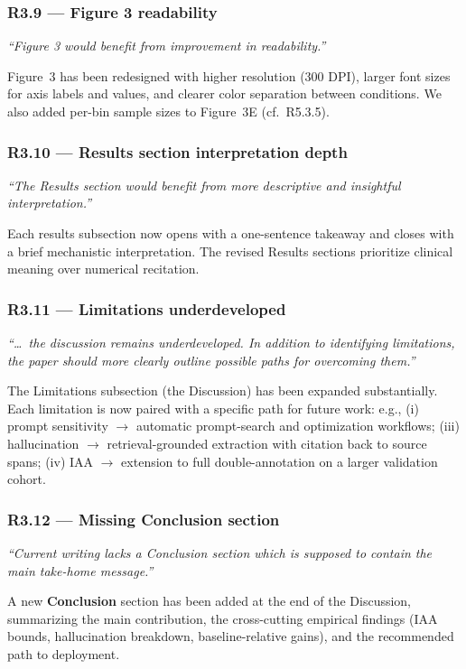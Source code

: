 \documentclass[11pt,letterpaper]{article}
\newcommand{\reviewer}[1]{\par\medskip\textcolor{blue!75!black}{\textit{#1}}\par\medskip}
\newcommand{\response}[1]{\par#1\par\medskip}
\begin{document}
\subsubsection*{R3.9 --- Figure 3 readability}
\reviewer{``Figure 3 would benefit from improvement in readability.''}
\response{Figure~3 has been redesigned with higher resolution (300 DPI), larger font sizes for axis labels and values, and clearer color separation between conditions. We also added per-bin sample sizes to Figure~3E (cf.\ R5.3.5).}

\subsubsection*{R3.10 --- Results section interpretation depth}
\reviewer{``The Results section would benefit from more descriptive and insightful interpretation.''}
\response{Each results subsection now opens with a one-sentence takeaway and closes with a brief mechanistic interpretation. The revised Results sections prioritize clinical meaning over numerical recitation.}

\subsubsection*{R3.11 --- Limitations underdeveloped}
\reviewer{``\dots\ the discussion remains underdeveloped. In addition to identifying limitations, the paper should more clearly outline possible paths for overcoming them.''}
\response{The Limitations subsection (the Discussion) has been expanded substantially. Each limitation is now paired with a specific path for future work: e.g., (i) prompt sensitivity $\rightarrow$ automatic prompt-search and optimization workflows; (iii) hallucination $\rightarrow$ retrieval-grounded extraction with citation back to source spans; (iv) IAA $\rightarrow$ extension to full double-annotation on a larger validation cohort.}

\subsubsection*{R3.12 --- Missing Conclusion section}
\reviewer{``Current writing lacks a Conclusion section which is supposed to contain the main take-home message.''}
\response{A new \textbf{Conclusion} section has been added at the end of the Discussion, summarizing the main contribution, the cross-cutting empirical findings (IAA bounds, hallucination breakdown, baseline-relative gains), and the recommended path to deployment.}
\end{document}
